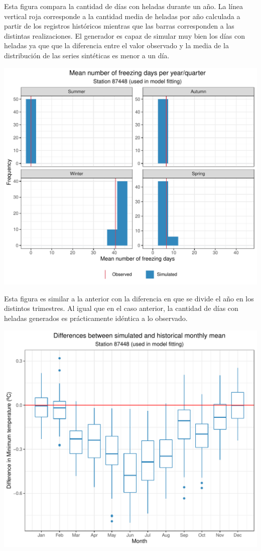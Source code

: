 \documentclass[
]{article}
\begin{document}
Esta figura compara la cantidad de días con heladas durante un año. La línea vertical roja corresponde a la cantidad media de heladas por año calculada a partir de los registros históricos mientras que las barras corresponden a las distintas realizaciones. El generador es capaz de simular muy bien los días con heladas ya que que la diferencia entre el valor observado y la media de la distribución de las series sintéticas es menor a un día.

\begin{center}\includegraphics{Webinario_Generador_files/figure-latex/unnamed-chunk-53-1} \end{center}

Esta figura es similar a la anterior con la diferencia en que se divide el año en los distintos trimestres. Al igual que en el caso anterior, la cantidad de días con heladas generados es prácticamente idéntica a lo observado.

\begin{center}\includegraphics{Webinario_Generador_files/figure-latex/unnamed-chunk-54-1} \end{center}
\end{document}

